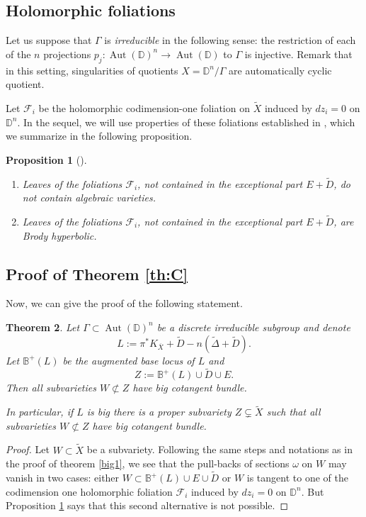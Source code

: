 \documentclass[JEP,XML,SOM,Unicode]{cedram}
\let\mathcal\mathscr
\theoremstyle{plain}
\newtheorem{theorem}{Theorem}[section]
\newtheorem{proposition}[theorem]{Proposition}
\theoremstyle{definition}
\numberwithin{equation}{theorem}
\newenvironment{enumerateth}
{\bgroup\def\theenumi{\thetheorem.\arabic{enumi}}
\begin{enumerate}
\setcounter{enumi}{\value{equation}}}
{\setcounter{equation}{\value{enumi}}
\end{enumerate}
\egroup}
\DeclareMathOperator{\Aut}{Aut}
\let\wtilde\widetilde
\newcommand\BB{\mathbb B}
\newcommand\DD{\mathbb D}
\begin{document}
\subsection{Holomorphic foliations}

Let us suppose that $\Gamma$ is \emph{irreducible} in the following sense:
the restriction of each of the $n$ projections $p_j: \Aut(\DD)^n \to \Aut(\DD)$ to $\Gamma$ is injective. Remark that in this setting, singularities of quotients $X=\DD^n/\Gamma$ are automatically cyclic quotient.

Let $\mathcal{F}_i$ be the holomorphic codimension-one foliation on $\widetilde{X}$ induced by $dz_i=0$ on $\DD^n$. In the sequel, we will use properties of these foliations established in \cite{RT}, which we summarize in the following proposition.

\skpt
\begin{proposition}[\cite{RT}]\label{fol}
\begin{enumerateth}
\item Leaves of the foliations $\mathcal{F}_i$, not contained in the exceptional part $E+\wtilde{D}$, do not contain algebraic varieties.
\item Leaves of the foliations $\mathcal{F}_i$, not contained in the exceptional part $E+\wtilde{D}$, are Brody hyperbolic.
\end{enumerateth}
\end{proposition}

\subsection{Proof of Theorem \ref{th:C}}
Now, we can give the proof of the following statement.

\begin{theorem}\label{polydisc}
Let $\Gamma \subset \Aut(\DD)^n$ be a discrete irreducible subgroup and denote $$L:=\pi^*K_{\overline{X}}+\wtilde{D}-n(\wtilde {\Delta} + \widetilde{D}).$$
Let $\BB^+(L)$ be the augmented base locus of $L$ and $$Z:=\BB^+(L) \cup \widetilde{D} \cup E.$$
Then all subvarieties $W \not \subset Z$ have big cotangent bundle.

In particular, if $L$ is big there is a proper subvariety $Z \subsetneq \widetilde{X}$ such that all subvarieties $W \not \subset Z$ have big cotangent bundle.
\end{theorem}

\begin{proof}
Let $W \subset \widetilde{X}$ be a subvariety.
Following the same steps and notations as in the proof of theorem \ref{big1}, we see that the pull-backs of sections $\omega$ on $W$ may vanish in two cases: either $W \subset \BB^+(L) \cup E \cup \widetilde{D}$ or $W$ is tangent to one of the codimension one holomorphic foliation $\mathcal{F}_i$ induced by $dz_i=0$ on $\DD^n$. But Proposition \ref{fol} says that this second alternative is not possible.
\end{proof}
\end{document}

